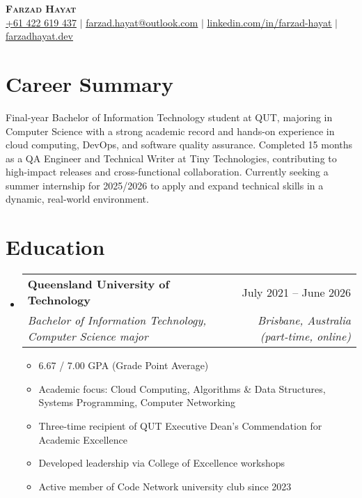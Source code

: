 \documentclass[a4,11pt]{article}
\makeatletter
\newcommand{\resumeItem}[1]{
  \item\small{
    {#1 \vspace{-2pt}}
  }
}
\newcommand{\resumeSubheading}[4]{
  \vspace{-2pt}\item
    \begin{tabular*}{0.97\textwidth}[t]{l@{\extracolsep{\fill}}r}
      \textbf{#1} & #2 \\
      \textit{\small#3} & \textit{\small #4} \\
    \end{tabular*}\vspace{-7pt}
}
\newcommand{\resumeSubHeadingListStart}{\begin{itemize}[leftmargin=0.15in, label={}]}
\newcommand{\resumeSubHeadingListEnd}{\end{itemize}}
\newcommand{\resumeItemListStart}{\begin{itemize}}
\newcommand{\resumeItemListEnd}{\end{itemize}\vspace{-5pt}}
\makeatother
\begin{document}

\begin{center}
    \textbf{\Huge \scshape Farzad Hayat} \\ \vspace{1pt}
    \small \href{tel:+61422619437}{\underline{+61 422 619 437}} $|$ \href{mailto:farzad.hayat@outlook.com}{\underline{farzad.hayat@outlook.com}} $|$ 
    \href{https://linkedin.com/in/farzad-hayat}{\underline{linkedin.com/in/farzad-hayat}} $|$
    \href{https://farzadhayat.dev}{\underline{farzadhayat.dev}}
\end{center}


\section{Career Summary}
\begin{itemize}[leftmargin=0.15in, label={}]
  \small{\item{
    Final-year Bachelor of Information Technology student at QUT, majoring in Computer Science with a strong academic record and hands-on experience in cloud computing, DevOps, and software quality assurance. Completed 15 months as a QA Engineer and Technical Writer at Tiny Technologies, contributing to high-impact releases and cross-functional collaboration. Currently seeking a summer internship for 2025/2026 to apply and expand technical skills in a dynamic, real-world environment.
  }}
\end{itemize}


\section{Education}
  \resumeSubHeadingListStart
    \resumeSubheading
      {Queensland University of Technology}{July 2021 -- June 2026}
      {Bachelor of Information Technology, Computer Science major}{Brisbane, Australia (part-time, online)}
      \resumeItemListStart
        \resumeItem{6.67 / 7.00 GPA (Grade Point Average)}
        \resumeItem{Academic focus: Cloud Computing, Algorithms \& Data Structures, Systems Programming, Computer Networking}
        \resumeItem{Three-time recipient of QUT Executive Dean’s Commendation for Academic Excellence}
        \resumeItem{Developed leadership via College of Excellence workshops}
        \resumeItem{Active member of Code Network university club since 2023}
      \resumeItemListEnd
  \resumeSubHeadingListEnd
\end{document}
